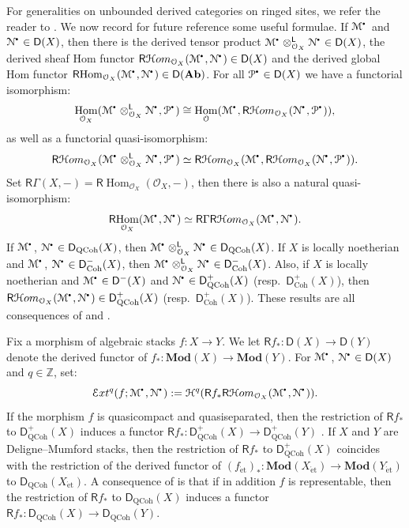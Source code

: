 \documentclass{amsart}
\theoremstyle{plain}
\theoremstyle{definition}
\theoremstyle{remark}
\numberwithin{equation}{section}
\newcommand{\Z}{\mathbb{Z}}
\newcommand{\Orb}{\mathcal{O}}
\newcommand{\et}{\mathrm{\acute{e}t}}
\newcommand{\MOD}[1]{\mathbf{Mod}({#1})}
\DeclareMathOperator{\Hom}{Hom}
\newcommand{\SRExt}[4]{\SExt^{{#1}}({#2};{#3},{#4})}
\newcommand{\COHO}[1]{\mathcal{H}^{{#1}}}
\newcommand{\RDERF}{\mathsf{R}}
\newcommand{\LDERF}{\mathsf{L}}
\newcommand{\DCAT}{\mathsf{D}}
\newcommand{\RHom}{\RDERF\!\Hom}
\newcommand{\SHom}{\mathcal{H}om}
\newcommand{\SRHom}{\RDERF\SHom}
\newcommand{\tensor}{\otimes}
\newcommand{\homotopic}{\simeq}
\newcommand{\AB}{\mathbf{Ab}}
\newcommand{\shv}[1]{\mathcal{{#1}}}
\newcommand{\SExt}{\mathcal{E}xt}
\newcommand{\QCPSH}[1]{{#1}_{*}}
\newcommand{\DQCOH}{\DCAT_{\mathrm{QCoh}}}
\newcommand{\DCOH}{\DCAT_{\mathrm{Coh}}}
\newcommand{\sbt}{\,\begin{picture}(-1,-1)(0,-2)\circle*{1.5}\end{picture}\ }
\newcommand{\cplx}[1]{\shv{{#1}}^{\sbt}}
\begin{document}
For generalities on
unbounded derived categories on ringed sites, we refer the reader to
\cite[\S18.6]{MR2182076}. We now record for future reference some useful
formulae. If $\cplx{M}$ and $\cplx{N} \in \DCAT(X)$,
then there is the derived tensor product $\cplx{M}
\tensor^{\LDERF}_{\Orb_X} \cplx{N} \in \DCAT(X)$, the derived sheaf
Hom functor $\SRHom_{\Orb_X}(\cplx{M},\cplx{N}) \in \DCAT(X)$ and the
derived global Hom functor $\RHom_{\Orb_X}(\cplx{M},\cplx{N}) \in
\DCAT(\AB)$. For all $\cplx{P}\in\DCAT(X)$ we have a functorial isomorphism:
\begin{equation}
  \Hom_{\Orb_X}(\cplx{M} \tensor^{\LDERF}_{\Orb_X} \cplx{N}, \cplx{P})
  \cong
  \Hom_{\Orb}(\cplx{M},\SRHom_{\Orb_X}(\cplx{N},\cplx{P})),\label{eq:ghomadj}  
\end{equation}
as well as a functorial quasi-isomorphism: 
\begin{equation}
  \SRHom_{\Orb_X}(\cplx{M} \tensor^{\LDERF}_{\Orb_X} \cplx{N},
  \cplx{P}) \homotopic
  \SRHom_{\Orb_X}(\cplx{M},\SRHom_{\Orb_X}(\cplx{N},\cplx{P}))\label{eq:lhomadj}. 
\end{equation}
Set $\RDERF \Gamma(X,-)  = \RHom_{\Orb_X}(\Orb_X,-)$, then there
is also a natural quasi-isomorphism:
\begin{equation}
  \RHom_{\Orb_X}(\cplx{M},\cplx{N}) \homotopic \RDERF \Gamma
  \SRHom_{\Orb_X}(\cplx{M},\cplx{N}). \label{eq:lghom} 
\end{equation}
If $\cplx{M}$, $\cplx{N}\in \DQCOH(X)$,
then $\cplx{M}\tensor^{\LDERF}_{\Orb_X}\cplx{N} \in \DQCOH(X)$. If
$X$ is locally noetherian and $\cplx{M}$, $\cplx{N} \in \DCOH^-(X)$,
then $\cplx{M}\tensor^{\LDERF}_{\Orb_X}\cplx{N} \in
\DCOH^-(X)$. Also, if $X$ is locally noetherian and $\cplx{M} \in
\DCAT^-(X)$ and $\cplx{N} \in \DQCOH^+(X)$ (resp.~$\DCOH^+(X)$), then
$\SRHom_{\Orb_X}(\cplx{M},\cplx{N}) \in \DQCOH^+(X)$
(resp.~$\DCOH^+(X)$). These results are all
consequences of \cite[\S6]{MR2312554} and \cite[\S2]{MR2434692}.

Fix a morphism of algebraic stacks $f : X \to Y$. We let $\RDERF f_* :
\DCAT(X) \to \DCAT(Y)$ denote the derived functor of $f_* : \MOD{X}
\to \MOD{Y}$. For $\cplx{M}$, $\cplx{N} \in \DCAT(X)$ and $q\in \Z$, set: 
\[
\SRExt{q}{f}{\cplx{M}}{\cplx{N}} := \COHO{q}(\RDERF
f_*\SRHom_{\Orb_X}(\cplx{M},\cplx{N})). 
\]
If the morphism $f$ is quasicompact and quasiseparated,
then the restriction of $\RDERF f_*$ to $\DQCOH^+(X)$ induces a
functor $\RDERF \QCPSH{f} : \DQCOH^+(X) \to \DQCOH^+(Y)$
\cite[Lem.~6.20]{MR2312554}.  If $X$ and $Y$ are Deligne--Mumford stacks, then
the restriction of $\RDERF f_*$ to $\DQCOH^+(X)$ coincides with the
restriction of the derived functor of $(f_{\et})_{*} : \MOD{X_{\et}} \to
\MOD{Y_{\et}}$ to $\DQCOH(X_{\et})$. A consequence of
\cite[Ex.~2.1.11]{MR2434692} is that if in addition $f$ is representable, then the
restriction of $\RDERF f_*$ to $\DQCOH(X)$ induces a functor $\RDERF
\QCPSH{f} : \DQCOH(X) \to \DQCOH(Y)$. 
\end{document}
